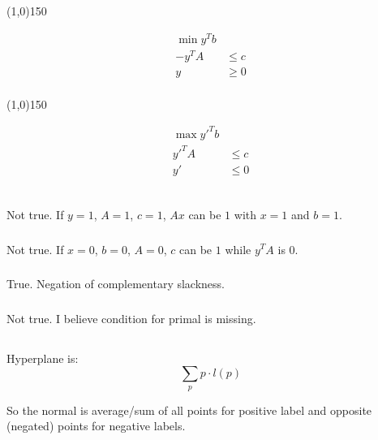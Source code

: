 \documentclass[a4paper,11pt,oneside,onecolumn]{article}
\def\zline{
    \vspace{-2.9em}
    \begin{center}\centering\line(1,0){150}\end{center}
    \vspace{-2.9em}
}
\begin{document}
\zline

\begin{align*}
\min y^Tb & \\
-y^TA & \le c \\
y & \ge 0 \\
\end{align*}

\zline

\begin{align*}
\max y'^Tb & \\
y'^TA & \le c \\
y' & \le 0 \\
\end{align*}

\subsection{}

\subsubsection{}

Not true. If $y = 1$, $A = 1$, $c = 1$, $Ax$ can be $1$ with $x = 1$ and $b = 1$.

\subsubsection{}

Not true. If $x = 0$, $b = 0$, $A = 0$, $c$ can be $1$ while $y^TA$ is $0$.

\subsubsection{}

True. Negation of complementary slackness.

\subsubsection{}

Not true. I believe condition for primal is missing.

\subsection{}

Hyperplane is:
$$
\sum_p p \cdot l(p)
$$

So the normal is average/sum of all points for positive label and opposite (negated) points for negative labels.
\end{document}
